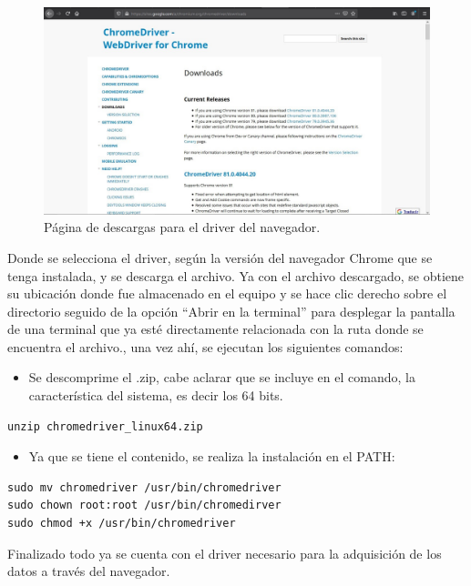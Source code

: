 {{\begin{figure}[H]
    \centering
    \includegraphics[scale=0.51]{Capitulo4/Documentos/imagenes_entorno/figura2-4-2.jpg}
    \caption{Página de descargas para el driver del navegador.}
    \label{2.4.2}
\end{figure}

\noindent Donde se selecciona el driver, según la versión del navegador Chrome que se tenga instalada, y se descarga el archivo. Ya con el archivo descargado, se obtiene su ubicación donde fue almacenado en el equipo y se hace clic derecho sobre el directorio seguido de la opción “Abrir en la terminal” para desplegar la pantalla de una terminal que ya esté directamente relacionada con la ruta donde se encuentra el archivo., una vez ahí, se ejecutan los siguientes comandos:

\begin{itemize}
    \item Se descomprime el .zip, cabe aclarar que se incluye en el comando, la característica del sistema, es decir los 64 bits.
\end{itemize}

\begin{lstlisting}
unzip chromedriver_linux64.zip  
\end{lstlisting}

\begin{itemize}
    \item Ya que se tiene el contenido, se realiza la instalación en el PATH:
\end{itemize}
\begin{lstlisting}
sudo mv chromedriver /usr/bin/chromedriver
sudo chown root:root /usr/bin/chromedirver
sudo chmod +x /usr/bin/chromedriver
\end{lstlisting}
\noindent Finalizado todo ya se cuenta con el driver necesario para la adquisición de los datos a través del navegador.
}
\\

}
